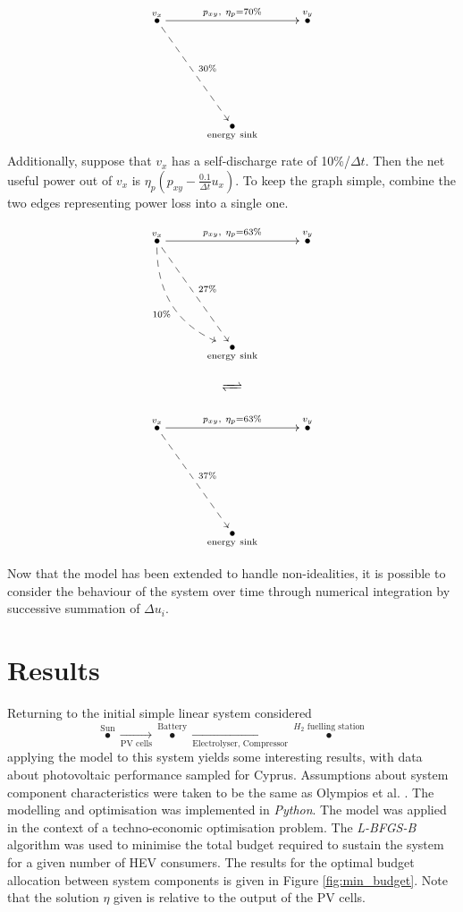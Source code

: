 \documentclass[]{article}
\numberwithin{equation}{section}
\theoremstyle{plain} %
\theoremstyle{definition}
\theoremstyle{remark}
\begin{document}
$$
    \xymatrix@C=3em@R=3em{
    \overset{v_x}{\bullet}\ar@{-->}[ddr]^{30\%}\ar@{->}[rr]^{p_{xy},\ \eta_p = 70\%} &&\overset{v_y}{\bullet}\ar@{} \\
    \\
    &\underset{\mathrm{energy\ sink}}{\bullet}\ar@{}
    }
$$
Additionally, suppose that $v_x$ has a self-discharge rate of 10\%/$\varDelta t$.
Then the net useful power out of $v_x$ is $\eta_p(p_{xy}-\frac{0.1}{\varDelta t}u_x)$.
To keep the graph simple, combine the two edges representing power loss into a single one.

\begin{minipage}[c]{0.3\textwidth}
    $$
        \xymatrix@C=3em@R=3em{
        \overset{v_x}{\bullet}\ar@{-->}[ddr]^{27\%}\ar@{-->}@/_2em/[ddr]_{10\%}\ar@{->}[rr]^{p_{xy},\ \eta_p = 63\%} &&\overset{v_y}{\bullet}\ar@{} \\
        \\
        &\underset{\mathrm{energy\ sink}}{\bullet}\ar@{}
        }
    $$

\end{minipage}
\hspace{0.045\textwidth}
\begin{minipage}[c]{0.1\textwidth}
    \Large$$\xrightleftharpoons{\hspace{1em}}$$
\end{minipage}
\hspace{0.05\textwidth}
\begin{minipage}[c]{0.3\textwidth}
    $$
        \xymatrix@C=3em@R=3em{
        \overset{v_x}{\bullet}\ar@{-->}[ddr]^{37\%}\ar@{->}[rr]^{p_{xy},\ \eta_p = 63\%} &&\overset{v_y}{\bullet}\ar@{} \\
        \\
        &\underset{\mathrm{energy\ sink}}{\bullet}\ar@{}
        }
    $$
\end{minipage}
\bigbreak
Now that the model has been extended to handle non-idealities, it is possible to consider the behaviour of the system over time
through numerical integration by successive summation of $\varDelta u_i$.

\section{Results}
Returning to the initial simple linear system considered
$$\overset{\text{Sun}}{\bullet} \xrightarrow[\text{PV cells}]{} \overset{\text{Battery}}{\bullet} \xrightarrow[\text{Electrolyser,\ Compressor}]{} \overset{H_{2} \text{ fuelling station}}{\bullet}$$
applying the model to this system yields some interesting results,
with data about photovoltaic performance sampled for Cyprus.
Assumptions about system component characteristics were taken to be
the same as Olympios et al. \cite{olympios2023technology}.
The modelling and optimisation was implemented in \emph{Python}.
\bigbreak
The model was applied in the context of a techno-economic optimisation problem.
The \emph{L-BFGS-B} algorithm was used to minimise the total budget required to sustain the system for a given number of HEV consumers.
The results for the optimal budget allocation between system components is given in Figure \ref{fig:min_budget}.
Note that the solution $\eta$ given is relative to the output of the PV cells.
\end{document}
